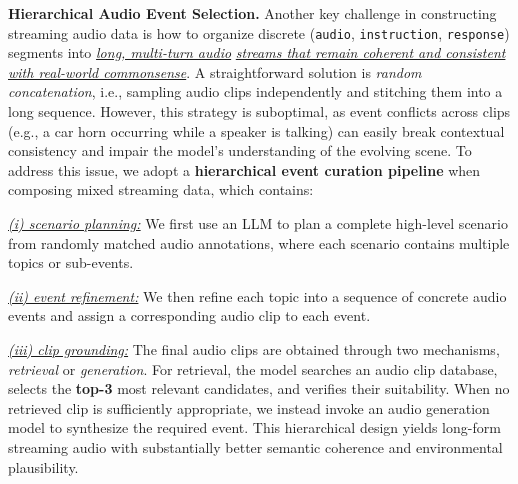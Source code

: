 \documentclass{llmxive}
\begin{document}

\textbf{Hierarchical Audio Event Selection.} Another key challenge in constructing streaming audio data is how to organize discrete (\texttt{audio}, \texttt{instruction}, \texttt{response}) segments into \underline{\textit{long, multi-turn audio}} \underline{\textit{streams that remain coherent and consistent with real-world commonsense}}. A straightforward solution is \textit{random concatenation}, i.e., sampling audio clips independently and stitching them into a long sequence. However, this strategy is suboptimal, as event conflicts across clips (e.g., a car horn occurring while a speaker is talking) can easily break contextual consistency and impair the model's understanding of the evolving scene. To address this issue, we adopt a \textbf{hierarchical event curation pipeline} when composing mixed streaming data, which contains: 

\vspace{-1mm}
\underline{\textit{(i) scenario planning:}} We first use an LLM to plan a complete high-level scenario from randomly matched audio annotations, where each scenario contains multiple topics or sub-events. 

\vspace{-1mm}
\underline{\textit{(ii) event refinement:}} We then refine each topic into a sequence of concrete audio events and assign a corresponding audio clip to each event. 

\vspace{-1mm}
\underline{\textit{(iii) clip grounding:}} The final audio clips are obtained through two mechanisms, \textit{retrieval} or \textit{generation}. For retrieval, the model searches an audio clip database, selects the \textbf{top-3} most relevant candidates, and verifies their suitability. When no retrieved clip is sufficiently appropriate, we instead invoke an audio generation model to synthesize the required event. This hierarchical design yields long-form streaming audio with substantially better semantic coherence and environmental plausibility.


\end{document}
